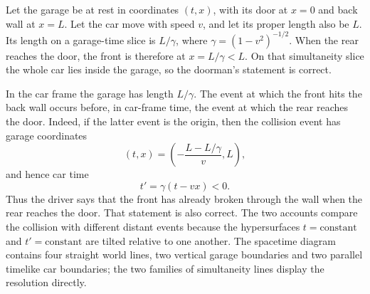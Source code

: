 \ExerciseEditorialNote

\begin{enumerate}[leftmargin=2.8em,itemsep=1em]
Let the garage be at rest in coordinates \((t,x)\), with its door at
\(x=0\) and back wall at \(x=L\).  Let the car move with speed \(v\), and
let its proper length also be \(L\).  Its length on a garage-time slice is
\(L/\gamma\), where \(\gamma=(1-v^2)^{-1/2}\).  When the rear reaches the
door, the front is therefore at \(x=L/\gamma<L\).  On that simultaneity
slice the whole car lies inside the garage, so the doorman's statement is
correct.

In the car frame the garage has length \(L/\gamma\).  The event at which the
front hits the back wall occurs before, in car-frame time, the event at which
the rear reaches the door.  Indeed, if the latter event is the origin, then
the collision event has garage coordinates
\[
 (t,x)=\left(-\frac{L-L/\gamma}{v},L\right),
\]
and hence car time
\[
 t'=\gamma(t-vx)<0.
\]
Thus the driver says that the front has already broken through the wall when
the rear reaches the door.  That statement is also correct.  The two accounts
compare the collision with different distant events because the hypersurfaces
\(t=\text{constant}\) and \(t'=\text{constant}\) are tilted relative to one
another.  The spacetime diagram contains four straight world lines, two
vertical garage boundaries and two parallel timelike car boundaries; the two
families of simultaneity lines display the resolution directly.
\end{enumerate}
